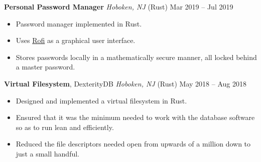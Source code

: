 \documentclass[10pt,letterpaper,roman]{moderncv}
\begin{document}
\hfill

\textbf{Personal Password Manager} \textit{Hoboken, NJ} (Rust) \hfill Mar 2019 -- Jul 2019
\begin{itemize}
\item Password manager implemented in Rust.
\item Uses \href{https://github.com/davatorium/rofi}{Rofi} as a graphical user interface.
\item Stores passwords locally in a mathematically secure manner, all locked behind a master password.
\end{itemize}

\hfill

\textbf{Virtual Filesystem}, DexterityDB \textit{Hoboken, NJ} (Rust) \hfill May 2018 -- Aug 2018
\begin{itemize}
\item Designed and implemented a virtual filesystem in Rust.
\item Ensured that it was the minimum needed to work with the database software so as to run lean and efficiently.
\item Reduced the file descriptors needed open from upwards of a million down to just a small handful.
\end{itemize}
\end{document}
